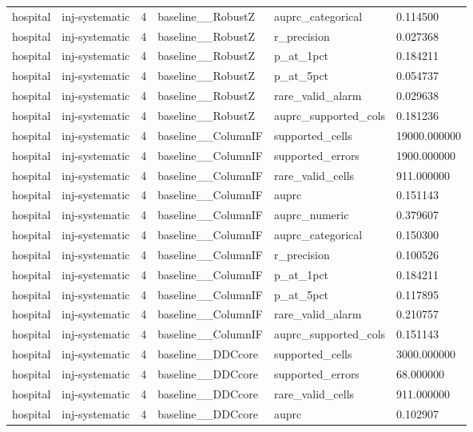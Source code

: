 \begin{tabular}{llllll}
hospital & inj-systematic & 4 & baseline\_\_RobustZ & auprc\_categorical & 0.114500 \\
hospital & inj-systematic & 4 & baseline\_\_RobustZ & r\_precision & 0.027368 \\
hospital & inj-systematic & 4 & baseline\_\_RobustZ & p\_at\_1pct & 0.184211 \\
hospital & inj-systematic & 4 & baseline\_\_RobustZ & p\_at\_5pct & 0.054737 \\
hospital & inj-systematic & 4 & baseline\_\_RobustZ & rare\_valid\_alarm & 0.029638 \\
hospital & inj-systematic & 4 & baseline\_\_RobustZ & auprc\_supported\_cols & 0.181236 \\
hospital & inj-systematic & 4 & baseline\_\_ColumnIF & supported\_cells & 19000.000000 \\
hospital & inj-systematic & 4 & baseline\_\_ColumnIF & supported\_errors & 1900.000000 \\
hospital & inj-systematic & 4 & baseline\_\_ColumnIF & rare\_valid\_cells & 911.000000 \\
hospital & inj-systematic & 4 & baseline\_\_ColumnIF & auprc & 0.151143 \\
hospital & inj-systematic & 4 & baseline\_\_ColumnIF & auprc\_numeric & 0.379607 \\
hospital & inj-systematic & 4 & baseline\_\_ColumnIF & auprc\_categorical & 0.150300 \\
hospital & inj-systematic & 4 & baseline\_\_ColumnIF & r\_precision & 0.100526 \\
hospital & inj-systematic & 4 & baseline\_\_ColumnIF & p\_at\_1pct & 0.184211 \\
hospital & inj-systematic & 4 & baseline\_\_ColumnIF & p\_at\_5pct & 0.117895 \\
hospital & inj-systematic & 4 & baseline\_\_ColumnIF & rare\_valid\_alarm & 0.210757 \\
hospital & inj-systematic & 4 & baseline\_\_ColumnIF & auprc\_supported\_cols & 0.151143 \\
hospital & inj-systematic & 4 & baseline\_\_DDCcore & supported\_cells & 3000.000000 \\
hospital & inj-systematic & 4 & baseline\_\_DDCcore & supported\_errors & 68.000000 \\
hospital & inj-systematic & 4 & baseline\_\_DDCcore & rare\_valid\_cells & 911.000000 \\
hospital & inj-systematic & 4 & baseline\_\_DDCcore & auprc & 0.102907 \\

\end{tabular}
